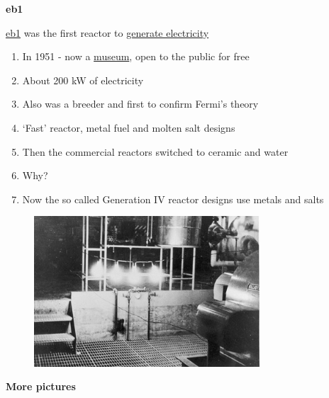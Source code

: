 \documentclass[aspectratio=1610,pdftex,dvipsnames,compress,xcolor={dvipsnames}]{beamer}
\newcommand{\acs}{\acrshort} %
\begin{document}
\begin{frame}[plain]{}
    \centering\LARGE\textbf{\acs{eb1}}
\end{frame}


\addtocounter{framenumber}{-1} 
\begin{frame}{\href{https://uidaho.pressbooks.pub/nuclearengineering/chapter/nuclear-fuel-cycle-system/}{\acs{eb1}} was the first reactor to \href{https://uidaho.pressbooks.pub/nuclearengineering/chapter/fuel-cycle-analysis/}{generate electricity}}
    \begin{enumerate}[series=outerlist,topsep=0pt,itemsep=21pt,leftmargin=*,label=(\arabic*)]
        \item[]In 1951 - now a \href{https://inl.gov/experimental-breeder-reactor-i/}{museum}, open to the public for free
        \item[]About 200 kW of electricity
        \item[]Also was a breeder and first to confirm Fermi’s theory
        \item[]`Fast' reactor, metal fuel and molten salt designs
        \item[]Then the commercial reactors switched to ceramic and water
        \item[]Why?
        \item[]Now the so called Generation IV reactor designs use metals and salts 
    \end{enumerate}
\end{frame}


\begin{frame}{}
    \begin{figure}
        \centering
        \includegraphics[width=0.75\textwidth]{ebr1.light.jpg}
    \end{figure}
\end{frame}


\begin{frame}[plain]{}
    \centering\LARGE\textbf{More pictures}
\end{frame}
\end{document}
